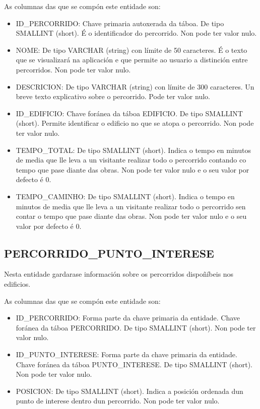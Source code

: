 As columnas das que se compón este entidade son:
\begin{itemize}
	\item ID\_PERCORRIDO: Chave primaria autoxerada da táboa. De tipo SMALLINT (short). É o identificador do percorrido. Non pode ter valor nulo.
	\item NOME: De tipo VARCHAR (string) con límite de 50 caracteres. É o texto que se visualizará na aplicación e que permite ao usuario a distinción entre percorridos. Non pode ter valor nulo.
	\item DESCRICION: De tipo VARCHAR (string) con límite de 300 caracteres. Un breve texto explicativo sobre o percorrido. Pode ter valor nulo.
	\item ID\_EDIFICIO: Chave foránea da táboa EDIFICIO. De tipo SMALLINT (short). Permite identificar o edificio no que se atopa o percorrido. Non pode ter valor nulo.
	\item TEMPO\_TOTAL: De tipo SMALLINT (short). Indica o tempo en minutos de media que lle leva a un visitante realizar todo o percorrido contando co tempo que pase diante das obras. Non pode ter valor nulo e o seu valor por defecto é 0.
	\item TEMPO\_CAMINHO: De tipo SMALLINT (short). Indica o tempo en minutos de media que lle leva a un visitante realizar todo o percorrido sen contar o tempo que pase diante das obras. Non pode ter valor nulo e o seu valor por defecto é 0.
\end{itemize}


\subsection{PERCORRIDO\_PUNTO\_INTERESE}
Nesta entidade gardarase información sobre os percorridos dispoñíbeis nos edificios.

As columnas das que se compón este entidade son:
\begin{itemize}
	\item ID\_PERCORRIDO: Forma parte da chave primaria da entidade. Chave foránea da táboa PERCORRIDO. De tipo SMALLINT (short). Non pode ter valor nulo.
	\item ID\_PUNTO\_INTERESE: Forma parte da chave primaria da entidade. Chave foránea da táboa PUNTO\_INTERESE. De tipo SMALLINT (short). Non pode ter valor nulo.
	\item POSICION: De tipo SMALLINT (short). Indica a posición ordenada dun punto de interese dentro dun percorrido. Non pode ter valor nulo.
\end{itemize}


